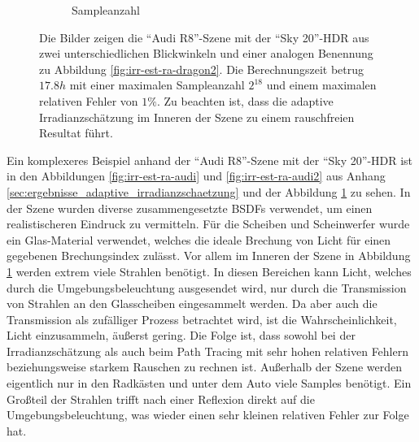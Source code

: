 \begin{figure}[h]
\begin{subfigure}[t]{0.5\textwidth}
				\caption{Sampleanzahl}
			\end{subfigure}
			\caption[Vertex Lighting anhand der \enquote{Audi R8}-Szene mit \enquote{Sky 20}-HDR]{Die Bilder zeigen die \enquote{Audi R8}-Szene mit der \enquote{Sky 20}-HDR aus zwei unterschiedlichen Blickwinkeln und einer analogen Benennung zu Abbildung \ref{fig:irr-est-ra-dragon2}. Die Berechnungszeit betrug $17.8\unit{h}$ mit einer maximalen Sampleanzahl $2^{18}$ und einem maximalen relativen Fehler von $1\unit{\%}$. Zu beachten ist, dass die adaptive Irradianzschätzung im Inneren der Szene zu einem rauschfreien Resultat führt.}
			\label{fig:irr-est-ra-audi3}
		\end{figure}

		\FloatBarrier

		Ein komplexeres Beispiel anhand der \enquote{Audi R8}-Szene mit der \enquote{Sky 20}-HDR ist in den Abbildungen \ref{fig:irr-est-ra-audi} und \ref{fig:irr-est-ra-audi2} aus Anhang \ref{sec:ergebnisse_adaptive_irradianzschaetzung} und der Abbildung \ref{fig:irr-est-ra-audi3} zu sehen.
		In der Szene wurden diverse zusammengesetzte BSDFs verwendet, um einen realistischeren Eindruck zu vermitteln.
		Für die Scheiben und Scheinwerfer wurde ein Glas-Material verwendet, welches die ideale Brechung von Licht für einen gegebenen Brechungsindex zulässt.
		Vor allem im Inneren der Szene in Abbildung \ref{fig:irr-est-ra-audi3} werden extrem viele Strahlen benötigt.
		In diesen Bereichen kann Licht, welches durch die Umgebungsbeleuchtung ausgesendet wird, nur durch die Transmission von Strahlen an den Glasscheiben eingesammelt werden.
		Da aber auch die Transmission als zufälliger Prozess betrachtet wird, ist die Wahrscheinlichkeit, Licht einzusammeln, äußerst gering.
		Die Folge ist, dass sowohl bei der Irradianzschätzung als auch beim Path Tracing mit sehr hohen relativen Fehlern beziehungsweise starkem Rauschen zu rechnen ist.
		Außerhalb der Szene werden eigentlich nur in den Radkästen und unter dem Auto viele Samples benötigt.
		Ein Großteil der Strahlen trifft nach einer Reflexion direkt auf die Umgebungsbeleuchtung, was wieder einen sehr kleinen relativen Fehler zur Folge hat.

